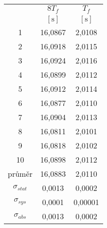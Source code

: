 \begin{tabular}{ccc}												\toprule
				&	$8 T_f$				&	$T_f$				\\
				&	$[\si{\second}]$	&	$[\si{\second}]$	\\	\midrule
1				&	16,0867				&	2,0108				\\
2				&	16,0918				&	2,0115				\\
3				&	16,0924				&	2,0116				\\
4				&	16,0899				&	2,0112				\\
5				&	16,0912				&	2,0114				\\
6				&	16,0877				&	2,0110				\\
7				&	16,0904				&	2,0113				\\
8				&	16,0811				&	2,0101				\\
9				&	16,0818				&	2,0102				\\
10				&	16,0898				&	2,0112				\\	\midrule[0.5pt]
průměr			&	16,0883				&	2,0110				\\
$\sigma_{stat}$	&	0,0013				&	0,0002				\\
$\sigma_{sys}$	&	0,0001				&	0,00001				\\
$\sigma_{abs}$	&	0,0013				&	0,0002				\\	\bottomrule
\end{tabular}
